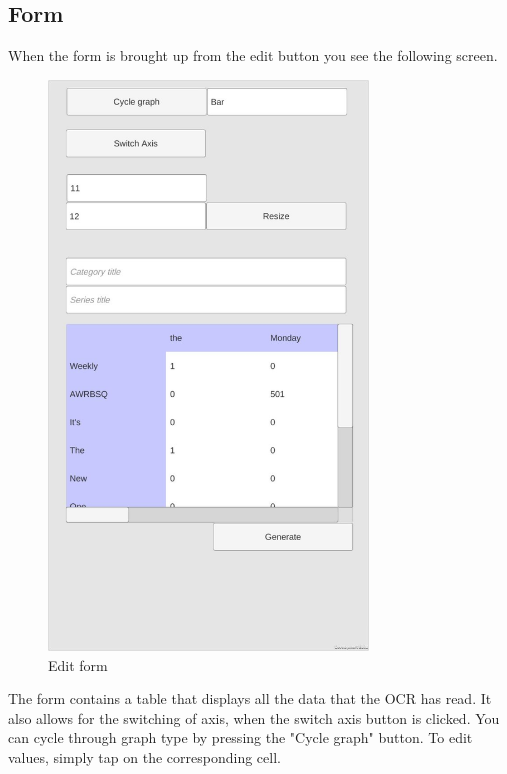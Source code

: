 \documentclass[a4paper,12pt]{article}
\begin{document}
\subsection{Form}
When the form is brought up from the edit button you see the following screen. 
\begin{figure}[H] 
\centering
    \includegraphics[width=85mm]{images/form.jpg}
    \caption{Edit form}
\end{figure}
The form contains a table that displays all the data that the OCR has read. It also allows for the switching of axis, when the switch axis button is clicked. You can cycle through graph type by pressing the "Cycle graph" button. To edit values, simply tap on the corresponding cell.
\end{document}
